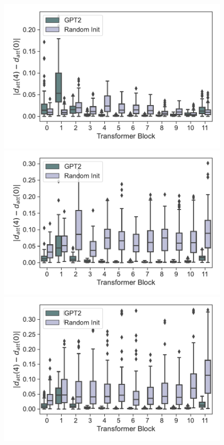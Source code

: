 \documentclass{article}
\begin{document}
\begin{figure}[H]
    \centering
    \begin{minipage}[b]{0.32\linewidth}
        \includegraphics[width=\linewidth]{figs/att_dist_diff_0_4_gpt2_dt_hopper_medium_42_K1.pdf}
    \end{minipage}
    \begin{minipage}[b]{0.32\linewidth}
        \includegraphics[width=\linewidth]{figs/att_dist_diff_0_4_gpt2_dt_halfcheetah_medium_42_K1.pdf}
    \end{minipage}
    \begin{minipage}[b]{0.32\linewidth}
        \includegraphics[width=\linewidth]{figs/att_dist_diff_0_4_gpt2_dt_walker2d_medium_42_K1.pdf}

\end{minipage}
\end{figure}
\end{document}
